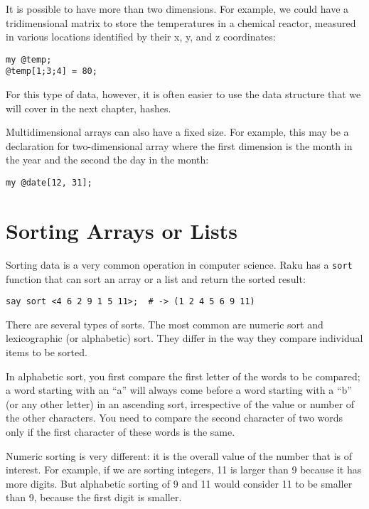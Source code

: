 It is possible to have more than two dimensions. For example, 
we could have a tridimensional matrix to store the temperatures 
in a chemical reactor, measured in various locations identified 
by their x, y, and z coordinates:

\begin{verbatim}
my @temp;
@temp[1;3;4] = 80;
\end{verbatim}

For this type of data, however, it is often easier to use the 
data structure that we will cover in the next chapter, hashes.

Multidimensional arrays can also have a fixed size. For 
example, this may be a declaration for two-dimensional array 
where the first dimension is the month in the year and 
the second the day in the month:

\begin{verbatim}
my @date[12, 31];
\end{verbatim}


\section{Sorting Arrays or Lists}
\label{sorting}

Sorting data is a very common operation in computer 
science. Raku has a {\tt sort} function that can sort 
an array or a list and return the sorted result:

\begin{verbatim}
say sort <4 6 2 9 1 5 11>;  # -> (1 2 4 5 6 9 11)
\end{verbatim}

There are several types of sorts. The most common are numeric 
sort and lexicographic (or alphabetic) sort. They differ 
in the way they compare individual items to be sorted. 

In alphabetic sort, you first compare the first letter of 
the words to be compared; a word starting with an ``a'' 
will always come before a word starting with a ``b'' 
(or any other letter) in an ascending sort, irrespective 
of the value or number of the other characters. You need to 
compare the second character of two words only if 
the first character of these words is the same. 

Numeric sorting is very different: it is the overall 
value of the number that is of interest. For example, 
if we are sorting integers, 11 is larger than 9 because 
it has more digits. But alphabetic sorting of 9 and 11 
would consider 11 to be smaller than 9, because the 
first digit is smaller.

